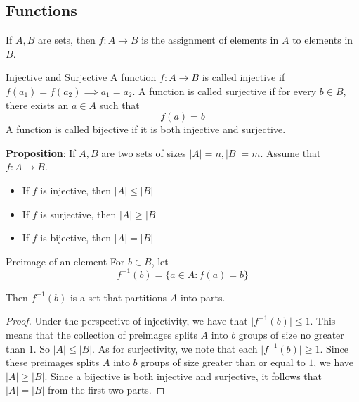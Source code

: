 \documentclass{report}
\begin{document}
\begin{topic}
    \section{Functions}
\end{topic}

If $A, B$ are sets, then $f: A \rightarrow B$ is the assignment of elements in $A$ to elements in $B$.
\begin{definition}{Injective and Surjective}
    A function $f: A \rightarrow B$ is called injective if $f(a_{1}) = f(a_{2}) \implies a_{1} = a_{2}$. A function is called surjective if for every $b \in B$, there exists an $a \in A$ such that
        \begin{equation*}
            f(a) = b
        \end{equation*}
    A function is called bijective if it is both injective and surjective.
\end{definition}
\textbf{Proposition}: If $A, B$ are two sets of sizes $\lvert A \rvert = n, \lvert B \rvert = m$. Assume that $f: A \rightarrow B$. 
    \begin{itemize}
        \item If $f$ is injective, then $\lvert A \rvert \leq \lvert B \rvert$

        \item If $f$ is surjective, then $\lvert A \rvert \geq \lvert B \rvert$

        \item If $f$ is bijective, then $\lvert A \rvert = \lvert B \rvert$ 
    \end{itemize}

\begin{definition}{Preimage of an element}
    For $b \in B$, let
        \begin{equation*}
            f^{-1}(b) = \{a \in A : f(a) = b\}
        \end{equation*}
\end{definition}
Then $f^{-1}(b)$ is a set that partitions $A$ into parts.
    \begin{proof}
         Under the perspective of injectivity, we have that $\lvert f^{-1}(b) \rvert \leq 1$. This means that the collection of preimages splits $A$ into $b$ groups of size no greater than $1$. So $\lvert A \rvert \leq \lvert B \rvert$. As for surjectivity, we note that each $\lvert f^{-1}(b) \rvert \geq 1$. Since these preimages splits $A$ into $b$ groups of size greater than or equal to $1$, we have $\lvert A \rvert \geq \lvert B \rvert$. Since a bijective is both injective and surjective, it follows that $\lvert A \rvert = \lvert B \rvert$ from the first two parts.
    \end{proof}
\end{document}
